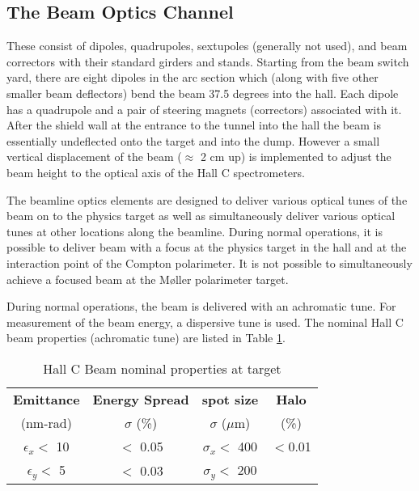 
\subsection{The Beam Optics Channel}

These consist of dipoles, quadrupoles, sextupoles (generally not
used), and beam correctors with their standard girders and
stands. Starting from the beam switch yard, there are eight dipoles in
the arc section which (along with five other smaller beam deflectors)
bend the beam 37.5 degrees into the hall. Each dipole has a quadrupole
and a pair of steering magnets (correctors) associated with it.  After
the shield wall at the entrance to the tunnel into the hall the beam
is essentially undeflected onto the target and into the dump. However
a small vertical displacement of the beam ($\approx$ 2 cm up) is
implemented to adjust the beam height to the optical axis of the Hall
C spectrometers.

The beamline optics elements are designed to deliver various optical
tunes of the beam on to the physics target as well as simultaneously
deliver various optical tunes at other locations along the
beamline. During normal operations, it is possible to deliver beam
with a focus at the physics target in the hall and at the interaction
point of the Compton polarimeter. It is not possible to simultaneously
achieve a focused beam at the M\o ller polarimeter target.

During normal operations, the beam is delivered with an achromatic
tune.  For measurement of the beam energy, a dispersive tune is
used. The nominal Hall C beam properties (achromatic tune) are listed
in Table \ref{beam_tab3}.
 
\begin{table}[hp]
\begin{center}
\begin{tabular}{|c|c|c|c|} \hline
{\bf Emittance}  & {\bf Energy Spread} & {\bf spot size}  & {\bf Halo}  \\
   (nm-rad)       &   $\sigma$ (\%)     & $\sigma$ ($\mu$m)&  (\%) \\ \hline 
$\epsilon_x <$ 10 &  $<$ 0.05           & $\sigma_x<$ 400  &  $<$0.01 \\
$\epsilon_y <$ 5  &  $<$ 0.03           & $\sigma_y<$ 200  &        \\ \hline
\end{tabular}
\end{center}
\caption[Beamline: Hall C Beam nominal properties at target]{Hall C Beam nominal properties at target}
\label{beam_tab3}
\end{table}

